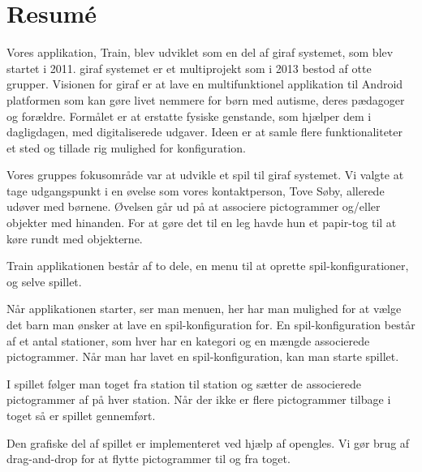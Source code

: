 \setcounter{page}{3}
\chapter*{Resumé}

Vores applikation, Train, blev udviklet som en del af \ac{giraf} systemet, som blev startet i 2011. \ac{giraf} systemet er et multiprojekt som i 2013 bestod af otte grupper. Visionen for \ac{giraf} er at lave en multifunktionel applikation til Android platformen som kan gøre livet nemmere for børn med autisme, deres pædagoger og forældre. Formålet er at erstatte fysiske genstande, som hjælper dem i dagligdagen, med digitaliserede udgaver. Ideen er at samle flere funktionaliteter et sted og tillade rig mulighed for konfiguration.

Vores gruppes fokusområde var at udvikle et spil til \ac{giraf} systemet. Vi valgte at tage udgangspunkt i en øvelse som vores kontaktperson, Tove Søby, allerede udøver med børnene. Øvelsen går ud på at associere pictogrammer og/eller objekter med hinanden. For at gøre det til en leg havde hun et papir-tog til at køre rundt med objekterne.

Train applikationen består af to dele, en menu til at oprette spil-konfigurationer, og selve spillet. 

Når applikationen starter, ser man menuen, her har man mulighed for at vælge det barn man ønsker at lave en spil-konfiguration for. En spil-konfiguration består af et antal stationer, som hver har en kategori og en mængde associerede pictogrammer. Når man har lavet en spil-konfiguration, kan man starte spillet.

I spillet følger man toget fra station til station og sætter de associerede pictogrammer af på hver station. Når der ikke er flere pictogrammer tilbage i toget så er spillet gennemført.

Den grafiske del af spillet er implementeret ved hjælp af \acl{opengles}. Vi gør brug af drag-and-drop for at flytte pictogrammer til og fra toget.